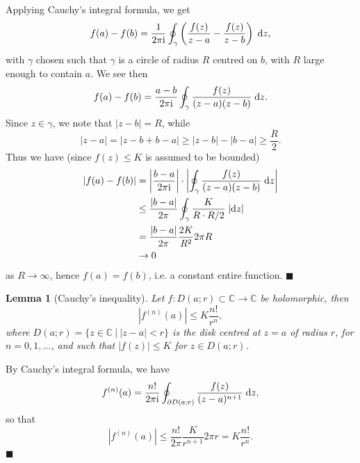 \documentclass[letter-paper]{tufte-book}
\newtheorem{lemma}[theorem]{\color{pastel-blue}Lemma}
\newenvironment{proof}[1][Proof]{\begin{trivlist}
\item[\hskip \labelsep {\bfseries #1}]}{\end{trivlist}}
\newcommand{\zi}{{\rm i}}
\newcommand{\qed}{\hfill$\blacksquare$}
\begin{document}
\begin{proof}
  Applying Cauchy's integral formula, we get
  \begin{equation*}
    f(a) - f(b) = \frac{1}{2\pi\zi}\oint_\gamma\left( \frac{f(z)}{z-a} - \frac{f(z)}{z-b}\right)\; \mathrm{d}z,
  \end{equation*}
  with $\gamma$ chosen such that $\gamma$ is a circle of radius $R$ centred on
  $b$, with $R$ large enough to contain $a$. We see then
  \begin{equation*}
    f(a) - f(b) = \frac{a-b}{2\pi\zi}\oint_\gamma \frac{f(z)}{(z-a)(z-b)}\; \mathrm{d}z.
  \end{equation*}
  Since $z\in\gamma$, we note that $|z-b| = R$, while
  \begin{equation*}
    |z-a| = |z - b + b -a| \geq |z-b| - |b-a| \geq \frac{R}{2}.
  \end{equation*}
  Thus we have (since $f(z) \leq K$ is assumed to be bounded)
  \begin{align*}
    |f(a) - f(b)| &= \left|\frac{b-a}{2\pi\zi}\right| \cdot \left| \oint_\gamma \frac{f(z)}{(z-a)(z-b)}\; \mathrm{d}z\right|\\
      &\leq \frac{|b-a|}{2\pi} \oint_\gamma \frac{K}{R \cdot R/2}\; |\mathrm{d}z| \\
      &= \frac{|b-a|}{2\pi} \frac{2K}{R^2} 2\pi R \\
      &\to 0
  \end{align*}
  as $R\to\infty$, hence $f(a) = f(b)$, i.e. a constant entire function. \qed
\end{proof}

\begin{lemma}[Cauchy's inequality]
  Let $f:D(a;r) \subset \mathbb{C} \to \mathbb{C}$ be holomorphic, then
  \begin{equation}
    \left|f^{(n)}(a)\right| \leq K\frac{n!}{r^n},
  \end{equation}
  where $D(a; r) = \{z\in\mathbb{C}\ |\ |z-a| < r\}$ is the disk centred at
  $z=a$ of radius $r$, for $n=0, 1, \ldots$, and such that $|f(z)| \leq K$ for
  $z\in D(a;r)$.
\end{lemma}

\begin{proof}
  By Cauchy's integral formula, we have
  \begin{equation*}
    f^{(n)}(a) = \frac{n!}{2\pi\zi} \oint_{\partial D(a;r)} \frac{f(z)}{(z-a)^{n+1}}\; \mathrm{d}z,
  \end{equation*}
  so that
  \begin{equation*}
    \left|f^{(n)}(a)\right| \leq \frac{n!}{2\pi} \frac{K}{r^{n+1}} 2\pi r = K\frac{n!}{r^n}.
  \end{equation*}
  \qed
\end{proof}
\end{document}
